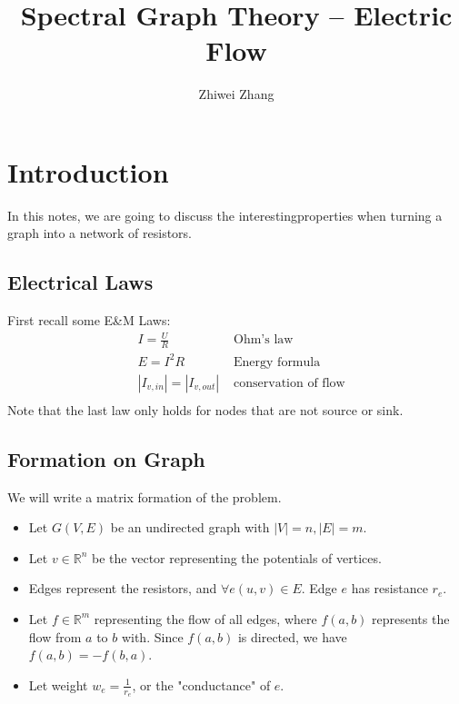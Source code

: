 \documentclass[12pt]{article}
\begin{document}
 
 
 
\title{Spectral Graph Theory -- Electric Flow}
\author{Zhiwei Zhang}

 
\maketitle
\section{Introduction}
In this notes, we are going to discuss the interestingproperties when turning a graph into a network of resistors.

\subsection{Electrical Laws}
First recall some E\&M Laws:
\begin{align*}
&I = \frac{U}{R} & \text{ Ohm's law}\\
&E = I^2R &\text{ Energy formula}\\
&|I_{v, in}| = |I_{v, out}| & \text{ conservation of flow}\\
\end{align*}
Note that the last law only holds for nodes that are not source or sink.

\subsection{Formation on Graph}
We will write a matrix formation of the problem.\\
\begin{itemize}
	\item Let $G(V, E)$ be an undirected graph with $|V| = n, |E| = m$.
	\item Let $v \in \mathbb{R}^n$ be the vector representing the potentials of vertices.
	\item Edges represent the resistors, and $\forall e(u, v) \in E$. Edge $e$ has resistance $r_e$.
	\item Let $f \in \mathbb{R}^m$ representing the flow of all edges, where $f(a, b)$ represents the flow from $a$ to $b$ with. Since $f(a, b)$ is directed, we have $f(a, b) = -f(b, a)$.
	\item Let weight $w_e= \frac{1}{r_e}$, or the "conductance" of $e$.
\end{itemize}
\end{document}
